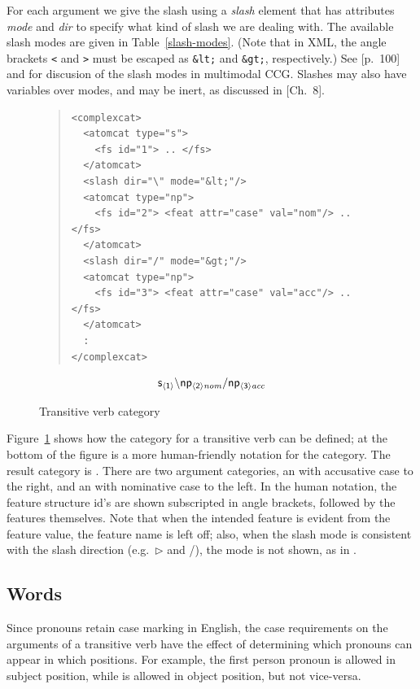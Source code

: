 \documentclass[11pt]{article}
\begin{document}
For each argument we give the slash using a \textsl{slash} element that
has attributes \textsl{mode} and \textsl{dir} to specify what kind of
slash we are dealing with. The available slash modes are given in
Table~\ref{slash-modes}. (Note that in XML, the angle brackets
\texttt{<} and \texttt{>} must be escaped as \texttt{\&lt;} and
\texttt{\&gt;}, respectively.) See \cite{Baldridge:2002}[p.\ 100] and
\cite{Baldridge/Kruijff:2003} for discusion of the slash modes in
multimodal CCG. Slashes may also have variables over modes, and may be
inert, as discussed in \cite{Baldridge:2002}[Ch.\ 8].

\begin{figure}
\begin{quote}
\begin{verbatim}
<complexcat>
  <atomcat type="s">
    <fs id="1"> .. </fs>
  </atomcat>
  <slash dir="\" mode="&lt;"/>
  <atomcat type="np">
    <fs id="2"> <feat attr="case" val="nom"/> .. </fs>
  </atomcat>
  <slash dir="/" mode="&gt;"/>
  <atomcat type="np">
    <fs id="3"> <feat attr="case" val="acc"/> .. </fs>
  </atomcat>
  :
</complexcat>
\end{verbatim}
\end{quote}
\[
\mathsf{s_{\langle1\rangle\mathit{}}} \backslash \mathsf{np_{\langle2\rangle\mathit{nom}}} / \mathsf{np_{\langle3\rangle\mathit{acc}}} 
\]
\caption{Transitive verb category}
\label{tv-cat}
\end{figure}

Figure~\ref{tv-cat} shows how the category for a transitive verb can be
defined; at the bottom of the figure is a more human-friendly notation
for the category. The result category is . There are two argument
categories, an  with accusative case to the right, and an 
with nominative case to the left. In the human notation, the feature
structure id's are shown subscripted in angle brackets, followed by the
features themselves. Note that when the intended feature is evident from
the feature value, the feature name is left off; also, when the slash
mode is consistent with the slash direction (e.g.\ $\triangleright$ and
/), the mode is not shown, as in \cite{Baldridge:2002}.

\subsection{Words}
\label{words}

Since pronouns retain case marking in English, the case requirements on
the arguments of a transitive verb have the effect of determining which
pronouns can appear in which positions. For example, the first person
pronoun  is allowed in subject position, while  is
allowed in object position, but not vice-versa. 
\end{document}
